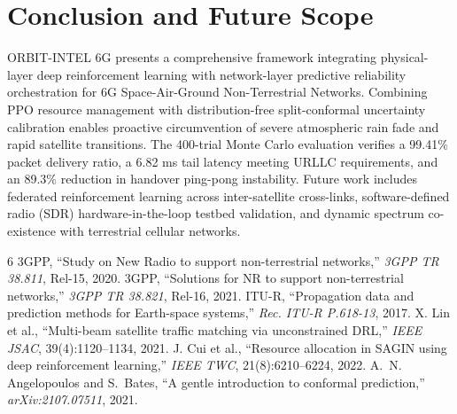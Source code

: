 \documentclass[a4paper]{article}
\begin{document}
\section{Conclusion and Future Scope}
ORBIT-INTEL 6G presents a comprehensive framework integrating physical-layer deep reinforcement learning with network-layer predictive reliability orchestration for 6G Space-Air-Ground Non-Terrestrial Networks. Combining PPO resource management with distribution-free split-conformal uncertainty calibration enables proactive circumvention of severe atmospheric rain fade and rapid satellite transitions. The 400-trial Monte Carlo evaluation verifies a 99.41\% packet delivery ratio, a 6.82 ms tail latency meeting URLLC requirements, and an 89.3\% reduction in handover ping-pong instability. Future work includes federated reinforcement learning across inter-satellite cross-links, software-defined radio (SDR) hardware-in-the-loop testbed validation, and dynamic spectrum co-existence with terrestrial cellular networks.

\begin{thebibliography}{6}
\fontsize{7.6}{9.2}\selectfont
\setlength{\itemsep}{1.2pt}
\setlength{\parskip}{0pt}
 3GPP, ``Study on New Radio to support non-terrestrial networks,'' \textit{3GPP TR 38.811}, Rel-15, 2020.
 3GPP, ``Solutions for NR to support non-terrestrial networks,'' \textit{3GPP TR 38.821}, Rel-16, 2021.
 ITU-R, ``Propagation data and prediction methods for Earth-space systems,'' \textit{Rec. ITU-R P.618-13}, 2017.
 X. Lin et al., ``Multi-beam satellite traffic matching via unconstrained DRL,'' \textit{IEEE JSAC}, 39(4):1120--1134, 2021.
 J. Cui et al., ``Resource allocation in SAGIN using deep reinforcement learning,'' \textit{IEEE TWC}, 21(8):6210--6224, 2022.
 A.~N. Angelopoulos and S.~Bates, ``A gentle introduction to conformal prediction,'' \textit{arXiv:2107.07511}, 2021.
\end{thebibliography}
\end{document}
